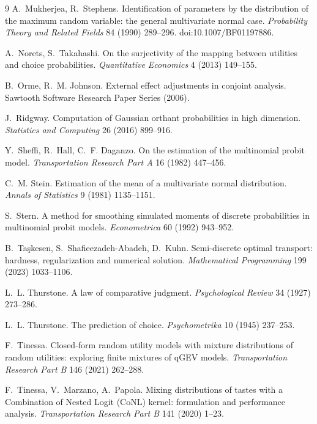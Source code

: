 \documentclass[12pt]{article}
\theoremstyle{remark}
\begin{document}
\begin{thebibliography}{9}
 A.~Mukherjea,
R.~Stephens. Identification of parameters by the distribution of the
maximum random variable: the general multivariate normal case.
\emph{Probability Theory and Related Fields} 84 (1990) 289--296.
doi:10.1007/BF01197886.

 A.~Norets, S.~Takahashi. On the surjectivity of the
mapping between utilities and choice probabilities. \emph{Quantitative
Economics} 4 (2013) 149--155.

 B.~Orme, R.~M. Johnson.
External effect adjustments in conjoint analysis. Sawtooth Software
Research Paper Series (2006).

 J.~Ridgway. Computation of Gaussian orthant
probabilities in high dimension. \emph{Statistics and Computing} 26 (2016)
899--916.

Y.~Sheffi, R.~Hall, C.~F. Daganzo. On the estimation of the multinomial
probit model. \emph{Transportation Research Part A} 16 (1982) 447--456.

 C.~M. Stein. Estimation of the mean
of a multivariate normal distribution. \emph{Annals of Statistics} 9
(1981) 1135--1151.

 S.~Stern. A method for smoothing
simulated moments of discrete probabilities in multinomial probit
models. \emph{Econometrica} 60 (1992) 943--952.

 B.~Ta\c{s}kesen, S.~Shafieezadeh-Abadeh,
D.~Kuhn. Semi-discrete optimal transport: hardness, regularization and
numerical solution. \emph{Mathematical Programming} 199 (2023)
1033--1106.

 L.~L. Thurstone. A law of comparative judgment.
\emph{Psychological Review} 34 (1927) 273--286.

 L.~L. Thurstone. The
prediction of choice. \emph{Psychometrika} 10 (1945) 237--253.

 F.~Tinessa. Closed-form random
utility models with mixture distributions of random utilities:
exploring finite mixtures of qGEV models. \emph{Transportation
Research Part B} 146 (2021) 262--288.

F.~Tinessa, V.~Marzano, A.~Papola. Mixing distributions of tastes with
a Combination of Nested Logit (CoNL) kernel: formulation and
performance analysis. \emph{Transportation Research Part B} 141 (2020)
1--23.


\end{thebibliography}
\end{document}
